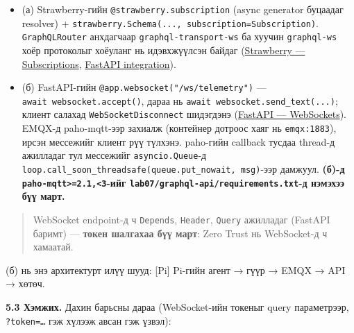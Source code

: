 \begin{itemize}
\tightlist
\item
  (а) Strawberry-гийн \texttt{@strawberry.\allowbreak{}subscription} (async generator буцаадаг resolver) + \texttt{strawberry.\allowbreak{}Schema(.\allowbreak{}.\allowbreak{}.\allowbreak{},\ subscription=\allowbreak{}Subscription)}. \texttt{GraphQLRouter} анхдагчаар \texttt{graphql-transport-ws} ба хуучин \texttt{graphql-ws} хоёр протоколыг хоёуланг нь идэвхжүүлсэн байдаг (\href{https://strawberry.rocks/docs/general/subscriptions}{Strawberry --- Subscriptions}, \href{https://strawberry.rocks/docs/integrations/fastapi}{FastAPI integration}).
\item
  (б) FastAPI-гийн \texttt{@app.\allowbreak{}websocket("/\allowbreak{}ws/\allowbreak{}telemetry")} --- \texttt{await\ websocket.\allowbreak{}accept()}, дараа нь \texttt{await\ websocket.\allowbreak{}send\_\allowbreak{}text(.\allowbreak{}.\allowbreak{}.\allowbreak{})}; клиент салахад \texttt{WebSocketDisconnect} шидэгдэнэ (\href{https://fastapi.tiangolo.com/advanced/websockets/}{FastAPI --- WebSockets}). EMQX-д paho-mqtt-ээр захиалж (контейнер дотроос хаяг нь \texttt{emqx:1883}), ирсэн мессежийг клиент рүү түлхэнэ. paho-гийн callback тусдаа thread-д ажилладаг тул мессежийг \texttt{asyncio.Queue}-д \texttt{loop.\allowbreak{}call\_\allowbreak{}soon\_\allowbreak{}threadsafe(queue.\allowbreak{}put\_\allowbreak{}nowait,\ msg)}-ээр дамжуул. \textbf{(б)-д \texttt{paho-mqtt\textgreater{}=\allowbreak{}2.\allowbreak{}1,\textless{}3}-ийг \texttt{lab07/\allowbreak{}graphql-api/\allowbreak{}requirements.\allowbreak{}txt}-д нэмэхээ бүү март.}
\end{itemize}

\begin{quote}
WebSocket endpoint-д ч \texttt{Depends}, \texttt{Header}, \texttt{Query} ажилладаг (FastAPI баримт) --- \textbf{токен шалгахаа бүү март}: Zero Trust нь WebSocket-д ч хамаатай.
\end{quote}

(б) нь энэ архитектурт илүү шууд: {[}Pi{]} Pi-гийн агент → гүүр → EMQX → API → хөтөч.

\textbf{5.3 Хэмжих.} Дахин барьсны дараа (WebSocket-ийн токеныг query параметрээр, \texttt{?token=\ldots{}} гэж хүлээж авсан гэж үзвэл):

\begin{Shaded}
\begin{Highlighting}[]
\NormalTok{ {-} }
\end{Highlighting}
\end{Shaded}

